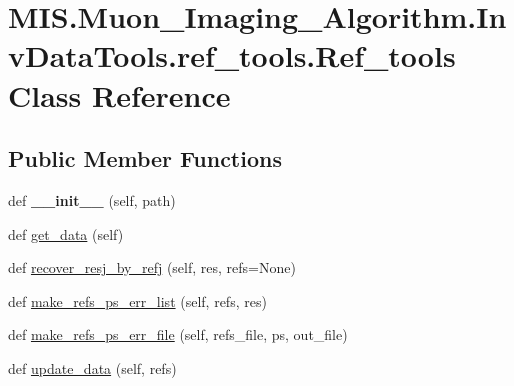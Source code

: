 \hypertarget{classMIS_1_1Muon__Imaging__Algorithm_1_1InvDataTools_1_1ref__tools_1_1Ref__tools}{}\section{M\+I\+S.\+Muon\+\_\+\+Imaging\+\_\+\+Algorithm.\+Inv\+Data\+Tools.\+ref\+\_\+tools.\+Ref\+\_\+tools Class Reference}
\label{classMIS_1_1Muon__Imaging__Algorithm_1_1InvDataTools_1_1ref__tools_1_1Ref__tools}
\subsection*{Public Member Functions}
\begin{DoxyCompactItemize}
\item 
\mbox{\label{classMIS_1_1Muon__Imaging__Algorithm_1_1InvDataTools_1_1ref__tools_1_1Ref__tools_a06ab0b39da901305a7c5b8b450558920}} 
def {\bfseries \+\_\+\+\_\+init\+\_\+\+\_\+} (self, path)
\item 
def \hyperlink{classMIS_1_1Muon__Imaging__Algorithm_1_1InvDataTools_1_1ref__tools_1_1Ref__tools_a1f166ba58a51c1ab8bb675a94c2ca682}{get\+\_\+data} (self)
\item 
def \hyperlink{classMIS_1_1Muon__Imaging__Algorithm_1_1InvDataTools_1_1ref__tools_1_1Ref__tools_a4c1eb0cdc900db8856094a7b7a0f6870}{recover\+\_\+resj\+\_\+by\+\_\+refj} (self, res, refs=None)
\item 
def \hyperlink{classMIS_1_1Muon__Imaging__Algorithm_1_1InvDataTools_1_1ref__tools_1_1Ref__tools_a237c092476b2df01a90f426377e3c75c}{make\+\_\+refs\+\_\+ps\+\_\+err\+\_\+list} (self, refs, res)
\item 
def \hyperlink{classMIS_1_1Muon__Imaging__Algorithm_1_1InvDataTools_1_1ref__tools_1_1Ref__tools_a3fac2070ed4506a350abf8869ea4948f}{make\+\_\+refs\+\_\+ps\+\_\+err\+\_\+file} (self, refs\+\_\+file, ps, out\+\_\+file)
\item 
def \hyperlink{classMIS_1_1Muon__Imaging__Algorithm_1_1InvDataTools_1_1ref__tools_1_1Ref__tools_adc58cff52c49c6937e2e1bb7489dcffa}{update\+\_\+data} (self, refs)
\end{DoxyCompactItemize}

